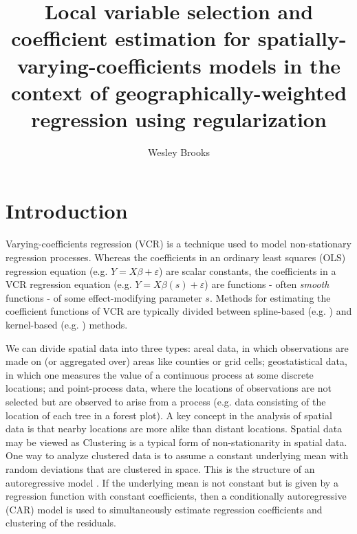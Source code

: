 \documentclass[authoryear, review, 11pt]{elsarticle}
\title{Local variable selection and coefficient estimation for spatially-varying-coefficients models in the context of geographically-weighted regression using regularization}
\author{Wesley Brooks}
\date{}                                           %
\begin{document}
\maketitle





\section{Introduction}
	Varying-coefficients regression (VCR) \citep{Hastie:1993a} is a technique used to model non-stationary regression processes. Whereas the coefficients in an ordinary least squares (OLS) regression equation (e.g. $Y = X \beta + \varepsilon$) are scalar constants, the coefficients in a VCR regression equation (e.g. $Y = X \beta(s) + \varepsilon$) are functions - often \emph{smooth} functions - of some effect-modifying parameter $s$.  Methods for estimating the coefficient functions of VCR are typically divided between spline-based (e.g. \cite{Wood:2006}) and kernel-based (e.g. \cite{Fan:1999, Loader:1999}) methods. 
	
	We can divide spatial data into three types: areal data, in which observations are made on (or aggregated over) areas like counties or grid cells; geostatistical data, in which one measures the value of a continuous process at some discrete locations; and point-process data, where the locations of observations are not selected but are observed to arise from a process (e.g. data consisting of the location of each tree in a forest plot).
	A key concept in the analysis of spatial data is that nearby locations are more alike than distant locations. Spatial data may be viewed as 
	Clustering is a typical form of non-stationarity in spatial data. One way to analyze clustered data is to assume a constant underlying mean with random deviations that are clustered in space. This is the structure of an autoregressive model \citep{}. If the underlying mean is not constant but is given by a regression function with constant coefficients, then a conditionally autoregressive (CAR) model \citep{} is used to simultaneously estimate regression coefficients and clustering of the residuals.
	
\end{document}
